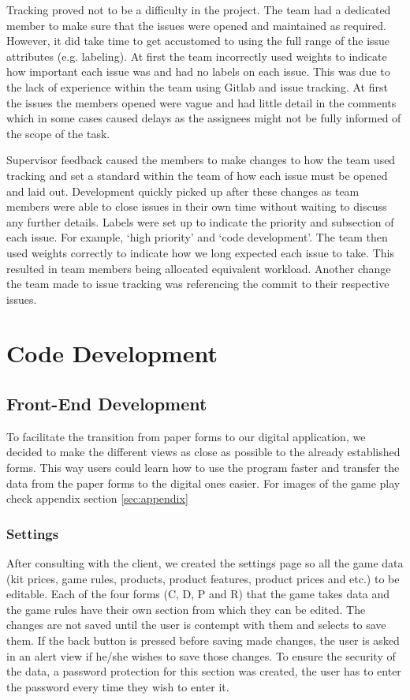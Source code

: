 \documentclass{l3proj}
\begin{document}
Tracking proved not to be a difficulty in the project. The team had a dedicated member to make sure that the issues were opened and maintained as required. 
However, it did take time to get accustomed to using the full range of the issue attributes (e.g. labeling). At first the team incorrectly used weights to indicate 
how important each issue was and had no labels on each issue. This was due to the lack of experience within the team using Gitlab and issue tracking. At first 
the issues the members opened were vague and had little detail in the comments which in some cases caused delays as the assignees might not be fully informed of the scope of the task.
 
Supervisor feedback caused the members to make changes to how the team used tracking and set a standard within the team of how each issue must be opened and laid out. 
Development quickly picked up after these changes as team members were able to close issues in their own time without waiting to discuss any further details. 
Labels were set up to indicate the priority and subsection of each issue. For example, ‘high priority’ and ‘code development’. The team then used weights correctly 
to indicate how we long expected each issue to take. This resulted in team members being allocated equivalent workload. Another change the team made to 
issue tracking was referencing the commit to their respective issues.

\section{Code Development}
\label{sec:development}
\subsection{Front-End Development}

To facilitate the transition from paper forms to our digital application, we decided to make the different views as close as possible to the already established forms. This way users could learn how to use the program faster and transfer the data from the paper forms to the digital ones easier. For images of the game play check appendix section \ref{sec:appendix}

\subsubsection{Settings}
After consulting with the client, we created the settings page so all the game data (kit prices, game rules, products, product features, product prices and etc.) to be editable. Each of the four forms (C, D, P and R) that the game takes data and the game rules have their own section from which they can be edited. The changes are not saved until the user is contempt with them and selects to save them. If the back button is pressed before saving made changes, the user is asked in an alert view if he/she wishes to save those changes. To ensure the security of the data, a password protection for this section was created, the user has to enter the password every time they wish to enter it.
\end{document}
